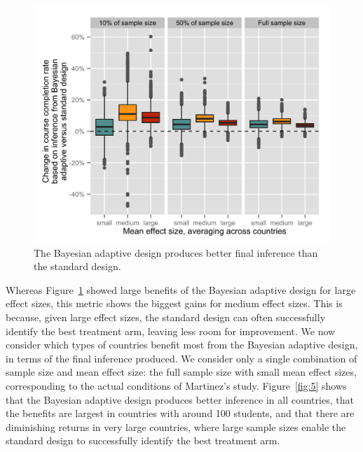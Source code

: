 \documentclass{acm_proc_article-sp}
\begin{document}
\begin{figure}
\centering
\includegraphics[width=\textwidth]{fig4}
\caption{The Bayesian adaptive design produces better final inference than the standard design.}
\label{fig:4}
{}
\end{figure}

Whereas Figure~\ref{fig:4} showed large benefits of the Bayesian adaptive design for large effect sizes, this metric shows the biggest gains for medium effect sizes. This is because, given large effect sizes, the standard design can often successfully identify the best treatment arm, leaving less room for improvement. 
We now consider which types of countries benefit most from the Bayesian adaptive design, in terms of the final inference produced. We consider only a single combination of sample size and mean effect size: the full sample size with small mean effect sizes, corresponding to the actual conditions of Martinez's study. Figure~\ref{fig:5} shows that the Bayesian adaptive design produces better inference in all countries, that the benefits are largest in countries with around 100 students, and that there are diminishing returns in very large countries, where large sample sizes enable the standard design to successfully identify the best treatment arm. 
\end{document}

